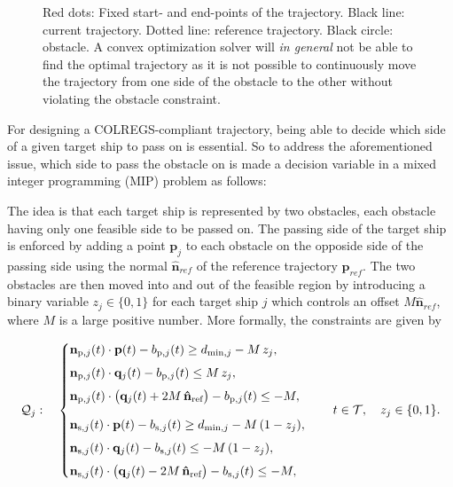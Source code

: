 \begin{figure}
    \centering
    
    \caption{Red dots: Fixed start- and end-points of the trajectory. Black line: current trajectory. Dotted line: reference trajectory. Black circle: obstacle. A convex optimization solver will \emph{in general} not be able to find the optimal trajectory as it is not possible to continuously move the trajectory from one side of the obstacle to the other without violating the obstacle constraint.}
    \label{fig:non-convex-obstacle}
\end{figure}

For designing a COLREGS-compliant trajectory, being able to decide which side of a given target ship to pass on is essential. So to address the aforementioned issue, which side to pass the obstacle on is made a decision variable in a mixed integer programming (MIP) problem as follows:

The idea is that each target ship is represented by two obstacles, each obstacle having only one feasible side to be passed on. The passing side of the target ship is enforced by adding a point $\mathbf p_j$ to each obstacle on the opposide side of the passing side using the normal $\mathbf{\hat n}_{ref}$ of the reference trajectory $\mathbf p_{ref}$. The two obstacles are then moved into and out of the feasible region by introducing a binary variable $z_j\in\{0,1\}$ for each target ship $j$ which controls an offset $M \mathbf{\hat n}_{ref}$, where $M$ is a large positive number. More formally, the constraints are given by


\begin{equation}\label{eq:colregs-bigM}
    \mathcal Q_j: \quad
    \begin{cases}
        \mathbf{n}_{\text p, j}(t) \cdot \mathbf{p}(t) - b_{\text p, j}(t) \ge  d_{\min, j} - M\,z_j, \\[1ex]
        \mathbf{n}_{\text p, j}(t) \cdot \mathbf{q}_j(t) - b_{\text p, j}(t) \le M\,z_j, \\[1ex]
        \mathbf{n}_{\text p, j}(t) \cdot \big(\mathbf{q}_j(t) + 2M\,\mathbf{\hat n}_\text{ref}\big) - b_{\text p, j}(t) \le -M, \\[2ex]

        \mathbf{n}_{\text s, j}(t) \cdot \mathbf{p}(t) - b_{\text s, j}(t) \ge
        d_{\min, j} - M\,(1 - z_j), \\[1ex]
        \mathbf{n}_{\text s, j}(t) \cdot \mathbf{q}_j(t) - b_{\text s, j}(t) \le -M\,(1 - z_j), \\[1ex]
        \mathbf{n}_{\text s, j}(t) \cdot \big(\mathbf{q}_j(t) - 2M\,\mathbf{\hat n}_\text{ref}\big) - b_{\text s, j}(t) \le -M,
    \end{cases}
    \quad t\in \mathcal{T},
    \quad z_j \in \{0,1\}.
\end{equation}
    
